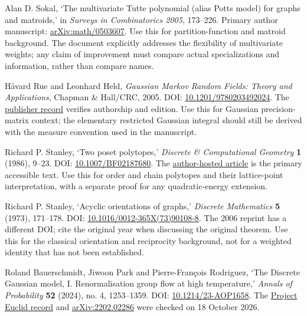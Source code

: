 \documentclass[
  11pt,
  a4paper,
]{report}
\begin{document}
Alan D. Sokal, `The multivariate Tutte polynomial (alias Potts model)
for graphs and matroids,' in \emph{Surveys in Combinatorics 2005},
173--226. Primary author manuscript:
\href{https://arxiv.org/abs/math/0503607}{arXiv:math/0503607}. Use this
for partition-function and matroid background. The document explicitly
addresses the flexibility of multivariate weights; any claim of
improvement must compare actual specializations and information, rather
than compare names.

Håvard Rue and Leonhard Held, \emph{Gaussian Markov Random Fields:
Theory and Applications}, Chapman \& Hall/CRC, 2005. DOI:
\href{https://doi.org/10.1201/9780203492024}{10.1201/9780203492024}. The
\href{https://www.routledge.com/Gaussian-Markov-Random-Fields-Theory-and-Applications-1st-Edition/Rue-Held-Reid-Isham-Tibshirani-Louis-Tong-Keiding/p/book/9781584884323}{publisher
record} verifies authorship and edition. Use this for Gaussian
precision-matrix context; the elementary restricted Gaussian integral
should still be derived with the measure convention used in the
manuscript.

Richard P. Stanley, `Two poset polytopes,' \emph{Discrete \&
Computational Geometry} \textbf{1} (1986), 9--23. DOI:
\href{https://doi.org/10.1007/BF02187680}{10.1007/BF02187680}. The
\href{https://math.mit.edu/~rstan/pubs/pubfiles/66.pdf}{author-hosted
article} is the primary accessible text. Use this for order and chain
polytopes and their lattice-point interpretation, with a separate proof
for any quadratic-energy extension.

Richard P. Stanley, `Acyclic orientations of graphs,' \emph{Discrete
Mathematics} \textbf{5} (1973), 171--178. DOI:
\href{https://doi.org/10.1016/0012-365X(73)90108-8}{10.1016/0012-365X(73)90108-8}.
The 2006 reprint has a different DOI; cite the original year when
discussing the original theorem. Use this for the classical orientation
and reciprocity background, not for a weighted identity that has not
been established.

Roland Bauerschmidt, Jiwoon Park and Pierre-François Rodriguez, `The
Discrete Gaussian model, I. Renormalisation group flow at high
temperature,' \emph{Annals of Probability} \textbf{52} (2024), no. 4,
1253--1359. DOI:
\href{https://doi.org/10.1214/23-AOP1658}{10.1214/23-AOP1658}. The
\href{https://projecteuclid.org/journals/annals-of-probability/volume-52/issue-4/The-Discrete-Gaussian-model-I-Renormalisation-group-flow-at-high/10.1214/23-AOP1658.full}{Project
Euclid record} and
\href{https://arxiv.org/abs/2202.02286}{arXiv:2202.02286} were checked
on 18 October 2026.
\end{document}

